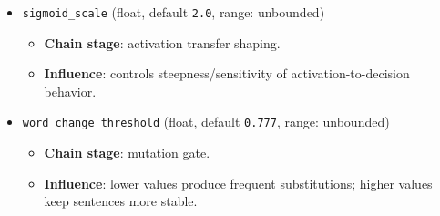 \documentclass[11pt,a4paper]{article}
\begin{document}
\begin{itemize}
  \item \texttt{sigmoid\_scale} (float, default \texttt{2.0}, range: unbounded)
  \begin{itemize}
    \item \textbf{Chain stage}: activation transfer shaping.
    \item \textbf{Influence}: controls steepness/sensitivity of activation-to-decision behavior.
  \end{itemize}

  \item \texttt{word\_change\_threshold} (float, default \texttt{0.777}, range: unbounded)
  \begin{itemize}
    \item \textbf{Chain stage}: mutation gate.
    \item \textbf{Influence}: lower values produce frequent substitutions; higher values keep sentences more stable.
  \end{itemize}
\end{itemize}
\end{document}
